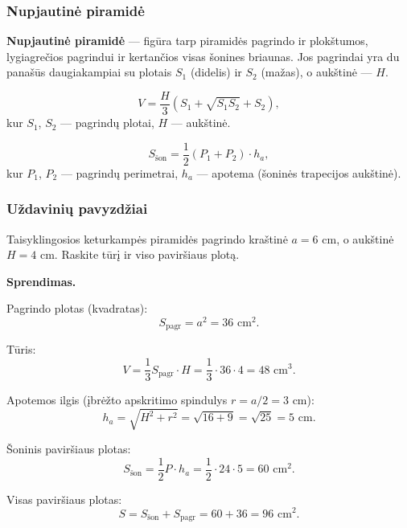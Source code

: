 \subsubsection*{Nupjautinė piramidė}

\begin{definition}
\textbf{Nupjautinė piramidė} --- figūra tarp piramidės pagrindo ir plokštumos, lygiagrečios pagrindui ir kertančios visas šonines briaunas. Jos pagrindai yra du panašūs daugiakampiai su plotais $S_1$ (didelis) ir $S_2$ (mažas), o aukštinė --- $H$.
\end{definition}

\begin{tcolorbox}[colback=green!5!white, colframe=green!50!black, title=Nupjautinės piramidės tūris]
\[
    V = \frac{H}{3}\left(S_1 + \sqrt{S_1 S_2} + S_2\right),
\]
kur $S_1$, $S_2$ --- pagrindų plotai, $H$ --- aukštinė.
\end{tcolorbox}

\begin{tcolorbox}[colback=blue!5!white, colframe=blue!50!black, title=Taisyklingosios nupjautinės piramidės šoninis paviršiaus plotas]
\[
    S_{\text{šon}} = \frac{1}{2}(P_1 + P_2) \cdot h_a,
\]
kur $P_1$, $P_2$ --- pagrindų perimetrai, $h_a$ --- apotema (šoninės trapecijos aukštinė).
\end{tcolorbox}

\subsubsection*{Uždavinių pavyzdžiai}

\begin{example}
Taisyklingosios keturkampės piramidės pagrindo kraštinė $a = 6$ cm, o aukštinė $H = 4$ cm. Raskite tūrį ir viso paviršiaus plotą.

\textbf{Sprendimas.}

Pagrindo plotas (kvadratas):
\[
    S_{\text{pagr}} = a^2 = 36 \text{ cm}^2.
\]

Tūris:
\[
    V = \frac{1}{3} S_{\text{pagr}} \cdot H = \frac{1}{3} \cdot 36 \cdot 4 = 48 \text{ cm}^3.
\]

Apotemos ilgis (įbrėžto apskritimo spindulys $r = a/2 = 3$ cm):
\[
    h_a = \sqrt{H^2 + r^2} = \sqrt{16 + 9} = \sqrt{25} = 5 \text{ cm}.
\]

Šoninis paviršiaus plotas:
\[
    S_{\text{šon}} = \frac{1}{2} P \cdot h_a = \frac{1}{2} \cdot 24 \cdot 5 = 60 \text{ cm}^2.
\]

Visas paviršiaus plotas:
\[
    S = S_{\text{šon}} + S_{\text{pagr}} = 60 + 36 = 96 \text{ cm}^2.
\]
\end{example}

